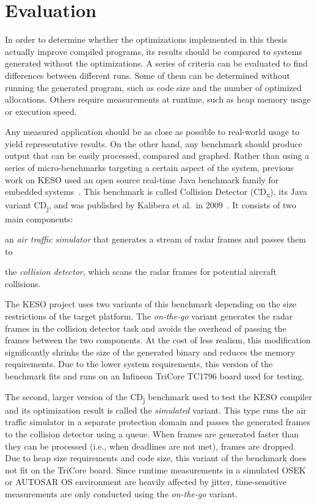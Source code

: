 
\chapter{Evaluation}
	\label{chapter:eval}
	In order to determine whether the optimizations implemented in this thesis actually improve compiled programs, its
	results should be compared to systems generated without the optimizations. A series of criteria can be evaluated to
	find differences between different runs. Some of them can be determined without running the generated program, such as
	code size and the number of optimized allocations. Others require measurements at runtime, such as heap memory usage
	or execution speed.

	Any measured application should be as close as possible to real-world usage to yield representative results. On the
	other hand, any benchmark should produce output that can be easily processed, compared and graphed. Rather than using
	a series of micro-benchmarks targeting a certain aspect of the system, previous work on KESO used an open source
	real-time Java benchmark family for embedded systems~\cite{erhardt:11:diplom, erhardt:11:jtres, stilkerich:11:cpe}.
	This benchmark is called Collision Detector (CD\textsubscript{x}), its Java variant CD\textsubscript{j}, and was
	published by Kalibera et al.\ in 2009~\cite{kalibera:09:jtres}. It consists of two main components:
	\begin{inparaenum}[(a)]
		\item an \emph{air traffic simulator} that generates a stream of radar frames and passes them to
		\item the \emph{collision detector}, which scans the radar frames for potential aircraft collisions.
	\end{inparaenum}

	The KESO project uses two variants of this benchmark depending on the size restrictions of the target platform. The
	\emph{on-the-go} variant generates the radar frames in the collision detector task and avoids the overhead of passing
	the frames between the two components. At the cost of less realism, this modification significantly shrinks the size
	of the generated binary and reduces the memory requirements. Due to the lower system requirements, this version of the
	benchmark fits and runs on an Infineon TriCore TC1796 board used for testing.

	The second, larger version of the CD\textsubscript{j} benchmark used to test the KESO compiler and its optimization
	result is called the \emph{simulated} variant. This type runs the air traffic simulator in a separate protection
	domain and passes the generated frames to the collision detector using a queue. When frames are generated faster than
	they can be processed (i.e., when deadlines are not met), frames are dropped. Due to heap size requirements and code
	size, this variant of the benchmark does not fit on the TriCore board. Since runtime measurements in a simulated OSEK
	or AUTOSAR OS environment are heavily affected by jitter, time-sensitive measurements are only conducted using the
	\emph{on-the-go} variant.

